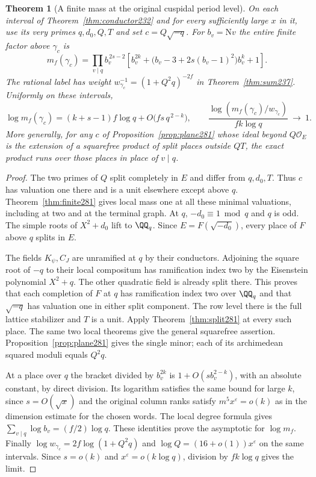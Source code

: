 \documentclass[a4paper,11pt]{article}
\newtheorem{theorem}[proposition]{Theorem}
\theoremstyle{definition}
\theoremstyle{remark}
\numberwithin{equation}{section}
\begin{document}
\begin{theorem}[A finite mass at the original cuspidal period level]\leavevmode
\label{thm:product281}
On each interval of Theorem~\ref{thm:conductor232} and for
every sufficiently large \(x\) in it, use its very primes
\(q,d_0,Q,T\) and set \(c=Q\sqrt{-q}\). For \(b_v=\mathrm Nv\)
the entire finite factor above \(\gamma_c\) is
\[
 m_f(\gamma_c)=\prod_{v\mid q} b_v^{\,2s-2}
  \left[b_v^{2k}+
      \bigl(b_v-3+2s(b_v-1)^2\bigr)b_v^k+1\right].
\]
The rational label has weight \(w_{\gamma_c}^{-1}
=(1+Q^2q)^{-2f}\) in Theorem~\ref{thm:sum237}. Uniformly
on these intervals,
\[
 \log m_f(\gamma_c)
  =(k+s-1)f\log q+O\bigl(fs\,q^{\,2-k}\bigr),
 \qquad \frac{\log(m_f(\gamma_c)/w_{\gamma_c})}
                {fk\log q}\ \longrightarrow\ 1 .
\]
More generally, for any \(c\) of Proposition~\ref{prop:plane281}
whose ideal beyond \(Q\mathcal O_E\) is the extension of a
squarefree product of split places outside \(QT\), the exact
product runs over those places in place of \(v\mid q\).
\end{theorem}
\begin{proof}
The two primes of \(Q\) split completely in \(E\) and differ
from \(q,d_0,T\). Thus \(c\) has valuation one there and is a
unit elsewhere except above \(q\). Theorem~\ref{thm:finite281}
gives local mass one at all these minimal valuations,
including at two and at the terminal graph. At \(q\),
\(-d_0\equiv1\bmod q\) and \(q\) is odd. The simple roots
of \(X^2+d_0\) lift to \(\QQ_q\). Since
\(E=F(\sqrt{-d_0})\), every place of \(F\) above \(q\)
splits in \(E\).

The fields \(K_\psi,C_J\) are unramified at \(q\) by their
conductors. Adjoining the square root of \(-q\) to their
local compositum has ramification index two by the Eisenstein
polynomial \(X^2+q\). The other quadratic field is already
split there. This proves that each completion of \(F\) at
\(q\) has ramification index two over \(\QQ_q\) and that \(\sqrt{-q}\)
has valuation one in either split component. The row level
there is the full lattice stabilizer and \(T\) is a unit.
Apply Theorem~\ref{thm:split281} at every such place.
The same two local theorems give the general squarefree
assertion. Proposition~\ref{prop:plane281} gives the single
minor; each of its archimedean squared moduli equals \(Q^2q\).

At a place over \(q\) the bracket divided by \(b_v^{2k}\)
is \(1+O(s b_v^{2-k})\), with an absolute constant, by
direct division. Its logarithm satisfies the same bound
for large \(k\), since \(s=O(\sqrt{x})\) and the original
column ranks satisfy \(m^5x^\varepsilon=o(k)\) as in the
dimension estimate for the chosen words. The local degree
formula gives \(\sum_{v\mid q}\log b_v=(f/2)\log q\).
These identities prove the asymptotic for \(\log m_f\).
Finally \(\log w_{\gamma_c}=2f\log(1+Q^2q)\) and
\(\log Q=(16+o(1))x^\varepsilon\) on the same intervals.
Since \(s=o(k)\) and \(x^\varepsilon=o(k\log q)\), division
by \(fk\log q\) gives the limit.
\end{proof}
\end{document}
